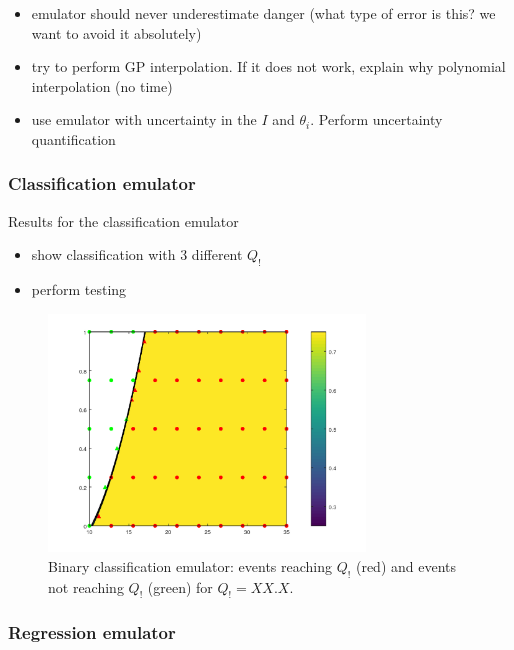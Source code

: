 {\begin{itemize}
\itemsep0em
  \item emulator should never underestimate danger (what type of error is this? we want to avoid it absolutely)
  \item try to perform GP interpolation. If it does not work, explain why polynomial interpolation (no time)
  \item use emulator with uncertainty in the $I$ and $\theta_i$. Perform uncertainty quantification
\end{itemize}


\subsubsection{Classification emulator}

Results for the classification emulator
\begin{itemize}
  \item show classification with 3 different $Q_!$
  \item perform testing 
\end{itemize}

\begin{figure}[htpb]
  \centering
  \includegraphics[width=0.75\textwidth]{Figures/classification.png}
  \caption{Binary classification emulator: events reaching $Q_!$ (red) and events not reaching $Q_!$ (green) for $Q_! = XX.X$.}
  \label{fig:classification_Q1}
\end{figure}


\subsubsection{Regression emulator}

}
